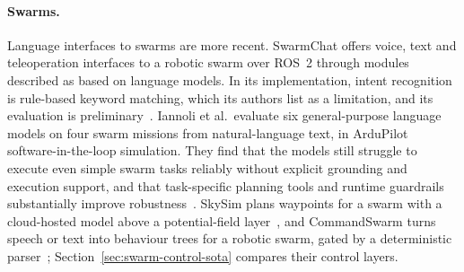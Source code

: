 \paragraph{Swarms.} Language interfaces to swarms are more recent. SwarmChat offers voice, text and
teleoperation interfaces to a robotic swarm over ROS~2 through modules described as based on
language models. In its implementation, intent recognition is rule-based keyword matching, which its
authors list as a limitation, and its evaluation is preliminary~\cite{swarmchat2025}. Iannoli et
al.\ evaluate six general-purpose language models on four swarm missions from natural-language
text, in ArduPilot software-in-the-loop simulation. They find that the models still struggle to
execute even simple swarm tasks reliably without explicit grounding and execution support, and that
task-specific planning tools and runtime guardrails substantially improve
robustness~\cite{iannoli2026}. SkySim plans waypoints for a swarm with a cloud-hosted model above a
potential-field layer~\cite{skysim2026}, and CommandSwarm turns speech or text into behaviour trees
for a robotic swarm, gated by a deterministic parser~\cite{commandswarm2026};
Section~\ref{sec:swarm-control-sota} compares their control layers.

